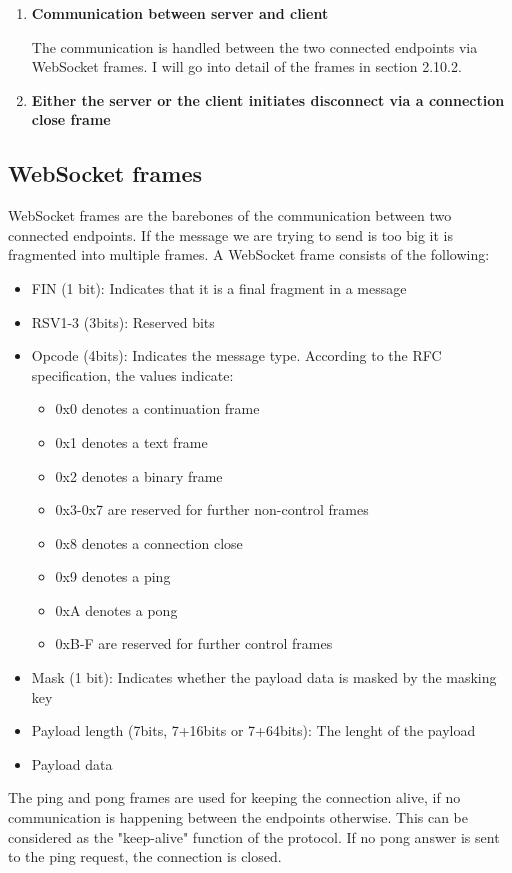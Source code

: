 \begin{enumerate}
			\item \textbf{Communication between server and client}

			The communication is handled between the two connected endpoints via WebSocket frames. I will go into detail of the frames in section 2.10.2.

			\item \textbf{Either the server or the client initiates disconnect via a connection close frame}
		\end{enumerate}

	\subsection{WebSocket frames}
		WebSocket frames are the barebones of the communication between two connected endpoints. If the message we are trying to send is too big it is fragmented
		into multiple frames.
		A WebSocket frame consists of the following:
		\begin{itemize}
			\item FIN (1 bit): Indicates that it is a final fragment in a message
			\item RSV1-3 (3bits): Reserved bits
			\item Opcode (4bits): Indicates the message type. According to the RFC specification, the values indicate:
			\begin{itemize}
				\item 0x0 denotes a continuation frame
      			\item 0x1 denotes a text frame
				\item 0x2 denotes a binary frame
				\item 0x3-0x7 are reserved for further non-control frames
				\item 0x8 denotes a connection close
				\item 0x9 denotes a ping
				\item 0xA denotes a pong
				\item 0xB-F are reserved for further control frames
			\end{itemize}	
			\item Mask (1 bit): Indicates whether the payload data is masked by the masking key
			\item Payload length (7bits, 7+16bits or 7+64bits): The lenght of the payload
			\item Payload data 
		\end{itemize}
		The ping and pong frames are used for keeping the connection alive, if no communication is happening
		 between the endpoints otherwise. This can be considered as the "keep-alive" function of the protocol. If no pong answer is sent to the
		ping request, the connection is closed.
		

